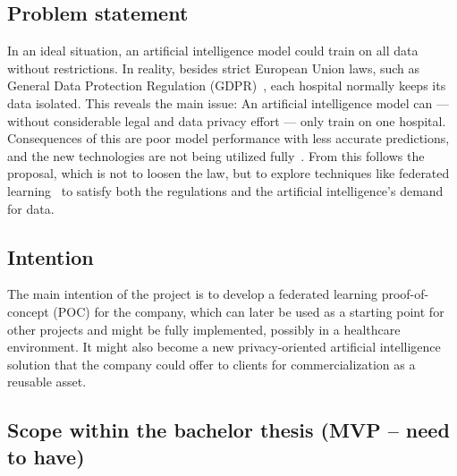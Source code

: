 \subsection{Problem statement}

In an ideal situation, an artificial intelligence model could train on all data without restrictions. In reality, besides strict European Union laws, such as General Data Protection Regulation (GDPR)~\cite{sasirekhaSystematicReviewPrivacypreserving2025, prayitnoSystematicReviewFederated2021}, each hospital normally keeps its data isolated. This reveals the main issue: An artificial intelligence model can --- without considerable legal and data privacy effort --- only train on one hospital. Consequences of this are poor model performance with less accurate predictions, and the new technologies are not being utilized fully~\cite{abdallaFutureArtificialIntelligence2025}. From this follows the proposal, which is not to loosen the law, but to explore techniques like federated learning~\cite{FederatedLearning2026} to satisfy both the regulations and the artificial intelligence's demand for data.


\subsection{Intention}

The main intention of the project is to develop a federated learning proof-of-concept (POC) for the company, which can later be used as a starting point for other projects and might be fully implemented, possibly in a healthcare environment. It might also become a new privacy-oriented artificial intelligence solution that the company could offer to clients for commercialization as a reusable asset.


\subsection{Scope within the bachelor thesis (MVP – need to have)}



